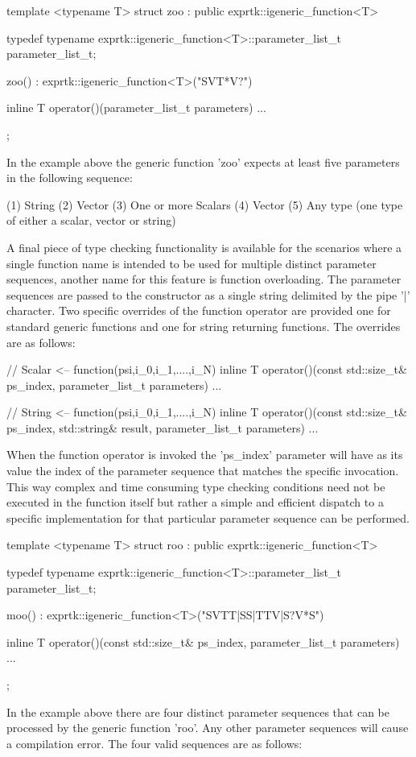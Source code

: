 template <typename T>
struct zoo : public exprtk::igeneric\_function<T>
{
typedef typename exprtk::igeneric\_function<T>::parameter\_list\_t
parameter\_list\_t;

zoo()
: exprtk::igeneric\_function<T>("SVT*V?")
{}

inline T operator()(parameter\_list\_t parameters)
{
	...
}
};


In the example above the generic function 'zoo' expects at least  five
parameters in the following sequence:

(1) String
(2) Vector
(3) One or more Scalars
(4) Vector
(5) Any type (one type of either a scalar, vector or string)


A final  piece of  type checking  functionality is  available for  the
scenarios where  a single  function name  is intended  to be  used for
multiple distinct parameter sequences,  another name for this  feature
is function  overloading. The  parameter sequences  are passed  to the
constructor as a  single string delimited  by the pipe  '|' character.
Two specific overrides of the  function operator are provided one  for
standard generic functions and one for string returning functions. The
overrides are as follows:

// Scalar <-- function(psi,i\_0,i\_1,....,i\_N)
inline T operator()(const std::size\_t\& ps\_index,
parameter\_list\_t parameters)
{
...
}

// String <-- function(psi,i\_0,i\_1,....,i\_N)
inline T operator()(const std::size\_t\& ps\_index,
std::string\& result,
parameter\_list\_t parameters)
{
...
}


When the function  operator is invoked  the 'ps\_index' parameter  will
have as its value the index of the parameter sequence that matches the
specific invocation. This way complex and time consuming type checking
conditions need not  be executed in  the function itself  but rather a
simple and efficient  dispatch to a  specific implementation for  that
particular parameter sequence can be performed.

template <typename T>
struct roo : public exprtk::igeneric\_function<T>
{
typedef typename exprtk::igeneric\_function<T>::parameter\_list\_t
parameter\_list\_t;

moo()
: exprtk::igeneric\_function<T>("SVTT|SS|TTV|S?V*S")
{}

inline T operator()(const std::size\_t\& ps\_index,
parameter\_list\_t parameters)
{
	...
}
};


In the example above there are four distinct parameter sequences  that
can be processed  by the generic  function 'roo'. Any  other parameter
sequences will cause a compilation error. The four valid sequences are
as follows:

